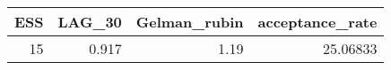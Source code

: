 \begin{longtable}{rrrr}
\toprule
ESS & LAG\_30 & Gelman\_rubin & acceptance\_rate \\ 
\midrule
15 & 0.917 & 1.19 & 25.06833 \\ 
\bottomrule
\end{longtable}

